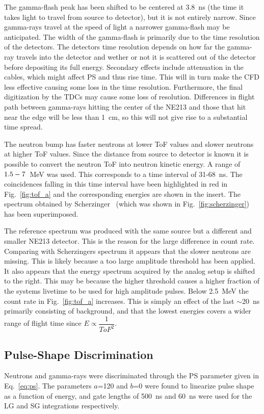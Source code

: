 \documentclass[main.tex]{subfiles}
\begin{document}
The gamma-flash peak has been shifted to be centered at \SI{3.8}{ns} (the time it takes light to travel from source to detector), but it is not entirely narrow. Since gamma-rays travel at the speed of light a narrower gamma-flash may be anticipated. The width of the gamma-flash is primarily due to the time resolution of the detectors. The detectors time resolution depends on how far the gamma-ray travels into the detector and wether or not it is scattered out of the detector before depositing its full energy. Secondary effects include attenuation in the cables, which might affect PS and thus rise time. This will in turn make the CFD less effective causing some loss in the time resolution. Furthermore, the final  digitization by the TDCs may cause some loss of resolution. Differences in flight path between gamma-rays hitting the center of the NE213 and those that hit near the edge will be less than \SI{1}{cm}, so this will not give rise to a substantial time spread. 

The neutron bump has faster neutrons at lower ToF values and slower neutrons at higher ToF values. Since the distance from source to detector is known it is possible to convert the neutron ToF into neutron kinetic energy. A range of $1.5\--7$~\si{\MeV} was used. This corresponds to a time interval of 31-\SI{68}{\ns}. The coincidences falling in this time interval have been highlighted in red in Fig.~\ref{fig:tof_a} and the corresponding energies are shown in the insert. The spectrum obtained by Scherzinger~\cite{ScherzingerPhd} (which was shown in Fig.~\ref{fig:scherzinger}) has been superimposed.

The reference spectrum was produced with the same source but a different and smaller NE213 detector. This is the reason for the large difference in count rate. Comparing with Scherzingers spectrum it appears that the slower neutrons are missing. This is likely because a too large amplitude threshold has been applied. It also appears that the energy spectrum acquired by the analog setup is shifted to the right. This may be because the higher threshold causes a higher fraction of the systems livetime to be used for high amplitude pulses. Below \SI{2.5}{MeV} the count rate in Fig.~\ref{fig:tof_a} increases. This is simply an effect of the last $\sim$\SI{20}{\ns} primarily consisting of background, and that the lowest energies covers a wider range of flight time since $E\propto \dfrac{1}{ToF^2}$.



\subsection{Pulse-Shape Discrimination}
Neutrons and gamma-rays were discriminated through the PS parameter given in Eq.~\ref{eq:ps}. The parameters $a$=120 and $b$=0 were found to linearize pulse shape as a function of energy, and gate lengths of \SI{500}{\ns} and \SI{60}{ns} were used for the LG and SG integrations respectively.
\end{document}
